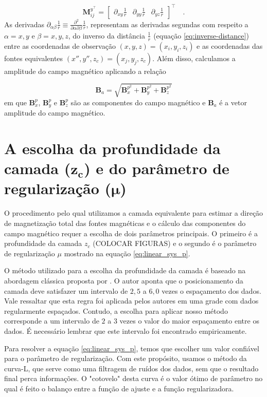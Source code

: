 \begin{equation}
\mathbf{M}_{ij}^{y^\top} = \begin{bmatrix}
\partial_{xy} \frac{1}{r} & 
\partial_{yy} \frac{1}{r} &
\partial_{yz} \frac{1}{r}
\end{bmatrix}^\top \quad .
\label{eq:Mij-matrix-z}
\end{equation}
As derivadas $\partial_{\alpha\beta} \frac{1}{r} \equiv \frac{\partial^{2}}{\partial \alpha \partial \beta} \frac{1}{r}$, representam as derivadas segundas com respeito a $\alpha = x, y$ e $\beta = x, y, z$, do inverso da distância $\frac{1}{r}$ (equação \ref{eq:inverse-distance}) entre as coordenadas de observação $(x, y, z) = (x_{i}, y_{i}, z_{i})$ e as coordenadas das fontes equivalentes $(x'', y'', z_{c}) = (x_{j}, y_{j}, z_{c})$. Além disso, calculamos a amplitude do campo magnético aplicando a relação

\begin{equation}
\mathbf{B}_a = \sqrt{ \mathbf{B}_{x}^{p^2} + \mathbf{B}_{y}^{p^2} + \mathbf{B}_{z}^{p^2}}   
\label{eq:amplitude_field}
\end{equation}
em que $\mathbf{B}_{x}^{p}$, $\mathbf{B}_{y}^{p}$ e $\mathbf{B}_{z}^{p}$ são as componentes do campo magnético e $\mathbf{B}_a$ é a vetor amplitude do campo magnético. 

\section{A escolha da profundidade da camada ($\mathbf{z_{c}}$) e do parâmetro de regularização ($\mathbf{\mu}$)}

O procedimento pelo qual utilizamos a camada equivalente para estimar a direção de magnetização total das fontes magnéticas e o cálculo das componentes do campo magnético requer a escolha de dois parâmetros principais. O primeiro é a profundidade da camada $z_c$ (COLOCAR FIGURAS) e o segundo é o parâmetro de regularização $\mu$ mostrado na equação \ref{eq:linear_sys_p}. 

O método utilizado para a escolha da profundidade da camada é baseado na abordagem clássica proposta por \cite{dampney1969}. O autor aponta que o posicionamento da camada deve satisfazer um intervalo de $2,5$ a $6,0$ vezes o espaçamento dos dados. Vale ressaltar que esta regra foi aplicada pelos autores em uma grade com dados regularmente espaçados. Contudo, a escolha para aplicar nosso método corresponde a um intervalo de $2$ a $3$ vezes o valor do maior espaçamento entre os dados. É necessário lembrar que este intervalo foi encontrado empiricamente. 

Para resolver a equação \ref{eq:linear_sys_p}, temos que escolher um valor confiável para o parâmetro de regularização. Com este propósito, usamos o método da curva-L, que serve como uma filtragem de ruídos dos dados, sem que o resultado final perca informações. O "cotovelo" desta curva é o valor ótimo de parâmetro no qual é feito o balanço entre a função de ajuste e a função regularizadora. 

